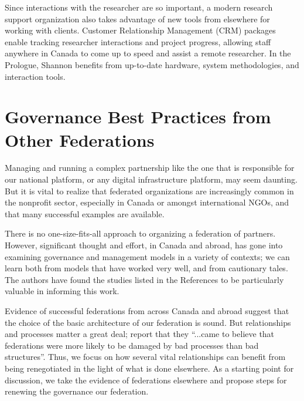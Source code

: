 \documentclass[11pt, letterpaper, twoside]{article}
\begin{document}

Since interactions with the researcher are so important, a modern
research support organization also takes advantage of new tools from
elsewhere for working with clients. Customer Relationship Management
(CRM) packages enable tracking researcher interactions and project
progress, allowing staff anywhere in Canada to come up to speed and
assist a remote researcher. In the Prologue, Shannon benefits from
up-to-date hardware, system methodologies, and interaction tools.

\section*{Governance Best Practices from Other Federations}
%
%

\nocite{*}
Managing and running a complex partnership like the one that is
responsible for our national platform, or any digital infrastructure
platform, may seem daunting. But it is vital to realize that federated
organizations are increasingly common in the nonprofit sector,
especially in Canada or amongst international NGOs, and that many
successful examples are available.


There is no one-size-fits-all approach to organizing a federation of
partners. However, significant thought and effort, in Canada and abroad,
has gone into examining governance and management models in a variety of
contexts; we can learn both from models that have worked very well, and
from cautionary tales. The authors have found the studies listed in the
References to be particularly valuable in informing this work.

Evidence of successful federations from across Canada and abroad suggest
that the choice of the basic architecture of our federation is sound.
But relationships and processes matter a great deal; \cite{widmer1999governance}
report that they ``...came to believe that federations were more
likely to be damaged by bad processes than bad structures''. Thus, we
focus on how several vital relationships can benefit from being
renegotiated in the light of what is done elsewhere. As a starting point
for discussion, we take the evidence of federations elsewhere and
propose steps for renewing the governance our federation.
\end{document}
